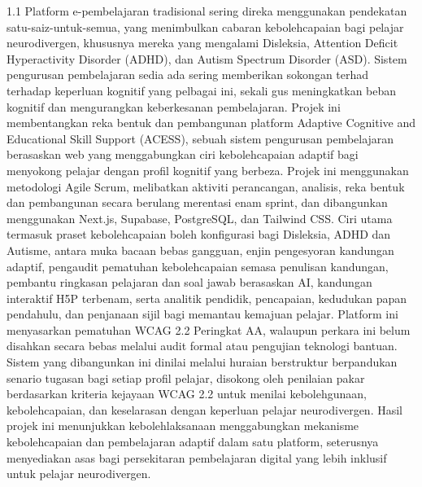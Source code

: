 \documentclass[12pt, oneside]{article} %
\begin{document}
\vspace{1cm}

\begin{spacing}{1.1}
Platform e-pembelajaran tradisional sering direka menggunakan pendekatan satu-saiz-untuk-semua, yang menimbulkan cabaran kebolehcapaian bagi pelajar neurodivergen, khususnya mereka yang mengalami Disleksia, Attention Deficit Hyperactivity Disorder (ADHD), dan Autism Spectrum Disorder (ASD). Sistem pengurusan pembelajaran sedia ada sering memberikan sokongan terhad terhadap keperluan kognitif yang pelbagai ini, sekali gus meningkatkan beban kognitif dan mengurangkan keberkesanan pembelajaran. Projek ini membentangkan reka bentuk dan pembangunan platform Adaptive Cognitive and Educational Skill Support (ACESS), sebuah sistem pengurusan pembelajaran berasaskan web yang menggabungkan ciri kebolehcapaian adaptif bagi menyokong pelajar dengan profil kognitif yang berbeza. Projek ini menggunakan metodologi Agile Scrum, melibatkan aktiviti perancangan, analisis, reka bentuk dan pembangunan secara berulang merentasi enam sprint, dan dibangunkan menggunakan Next.js, Supabase, PostgreSQL, dan Tailwind CSS. Ciri utama termasuk praset kebolehcapaian boleh konfigurasi bagi Disleksia, ADHD dan Autisme, antara muka bacaan bebas gangguan, enjin pengesyoran kandungan adaptif, pengaudit pematuhan kebolehcapaian semasa penulisan kandungan, pembantu ringkasan pelajaran dan soal jawab berasaskan AI, kandungan interaktif H5P terbenam, serta analitik pendidik, pencapaian, kedudukan papan pendahulu, dan penjanaan sijil bagi memantau kemajuan pelajar. Platform ini menyasarkan pematuhan WCAG 2.2 Peringkat AA, walaupun perkara ini belum disahkan secara bebas melalui audit formal atau pengujian teknologi bantuan. Sistem yang dibangunkan ini dinilai melalui huraian berstruktur berpandukan senario tugasan bagi setiap profil pelajar, disokong oleh penilaian pakar berdasarkan kriteria kejayaan WCAG 2.2 untuk menilai kebolehgunaan, kebolehcapaian, dan keselarasan dengan keperluan pelajar neurodivergen. Hasil projek ini menunjukkan kebolehlaksanaan menggabungkan mekanisme kebolehcapaian dan pembelajaran adaptif dalam satu platform, seterusnya menyediakan asas bagi persekitaran pembelajaran digital yang lebih inklusif untuk pelajar neurodivergen.
\end{spacing}

\vfill \null

\newpage


\vfill \null
{}
{}
\tableofcontents
\newpage
\end{document}
